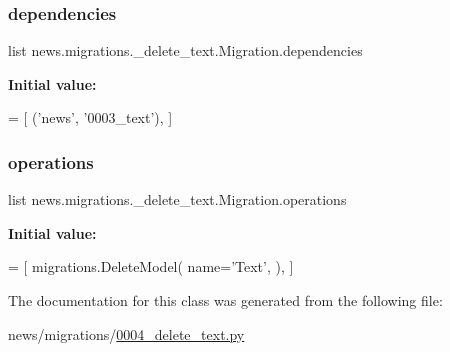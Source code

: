 \subsubsection{\texorpdfstring{dependencies}{dependencies}}
{\footnotesize\ttfamily list news.\+migrations.\+\_\+delete\+\_\+text.\+Migration.\+dependencies\hspace{0.3cm}{\ttfamily [static]}}

{\bfseries Initial value\+:}
\begin{DoxyCode}
=  [
        (\textcolor{stringliteral}{'news'}, \textcolor{stringliteral}{'0003\_text'}),
    ]
\end{DoxyCode}
\mbox{\label{classnews_1_1migrations_1_10004__delete__text_1_1_migration_a2f379b87d68991adbc82291d97785652}} 
\subsubsection{\texorpdfstring{operations}{operations}}
{\footnotesize\ttfamily list news.\+migrations.\+\_\+delete\+\_\+text.\+Migration.\+operations\hspace{0.3cm}{\ttfamily [static]}}

{\bfseries Initial value\+:}
\begin{DoxyCode}
=  [
        migrations.DeleteModel(
            name=\textcolor{stringliteral}{'Text'},
        ),
    ]
\end{DoxyCode}


The documentation for this class was generated from the following file\+:\begin{DoxyCompactItemize}
\item 
news/migrations/\mbox{\hyperlink{0004__delete__text_8py}{0004\+\_\+delete\+\_\+text.\+py}}\end{DoxyCompactItemize}
